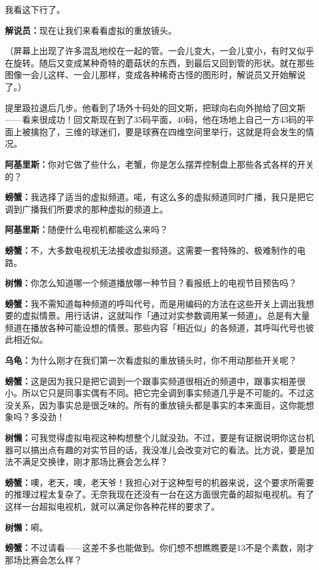 \documentclass[
  12pt,
  twoside,
  openright,
  oldfontcommands,
]{memoir}
\newcommand{\dialogname}[1]{{\heifamily\bfseries #1}}
\begin{document}
我看这下行了。

\dialogname{解说员：}现在让我们来看看虚拟的重放镜头。

（屏幕上出现了许多混乱地绞在一起的管。一会儿变大，一会儿变小，有时又似乎在旋转。随后又变成某种奇特的蘑菇状的东西，到最后又回到管的形状。就在那些图像一会儿这样、一会儿那样，变成各种稀奇古怪的图形时，解说员又开始解说了。）

提里趿拉退后几步。他看到了场外十码处的回文斯，把球向右向外抛给了回文斯------看来很成功！回文斯现在到了35码平面，40码，他在场地上自己一方43码的平面上被擒抱了，三维的球迷们，要是球赛在四维空间里举行，这就是将会发生的情况。

\dialogname{阿基里斯：}你对它做了些什么，老蟹，你是怎么摆弄控制盘上那些各式各样的开关的？

\dialogname{螃蟹：}我选择了适当的虚拟频道。喏，有这么多的虚拟频道同时广播，我只是把它调到广播我们所要求的那种虚拟的频道上。

\dialogname{阿基里斯：}随便什么电视机都能这么来吗？

\dialogname{螃蟹：}不，大多数电视机无法接收虚拟频道。这需要一套特殊的、极难制作的电路。

\dialogname{树懒：}你怎么知道哪一个频道播放哪一种节目？看报纸上的电视节目预告吗？

\dialogname{螃蟹：}我不需知道每种频道的呼叫代号，而是用编码的方法在这些开关上调出我想要的虚拟情景。用行话讲，这就叫作「通过对实参数调用某一频道」。总是有大量频道在播放各种可能设想的情景。那些内容「相近似」的各频道，其呼叫代号也彼此相近似。

\dialogname{乌龟：}为什么刚才在我们第一次看虚拟的重放镜头时，你不用动那些开关呢？

\dialogname{螃蟹：}这是因为我只是把它调到一个跟事实频道很相近的频道中，跟事实相差很小。所以它只是同事实偶有不同。把它完全调到事实频道几乎是不可能的。不过这没关系，因为事实总是很乏味的。所有的重放镜头都是事实的本来面目，这你能想象吗？多没劲！

\dialogname{树懒：}可我觉得虚拟电视这种构想整个儿就没劲。不过，要是有证据说明你这台机器可以搞出点有趣的对实节目的话，我没准儿会改变对它的看法。比方说，要是加法不满足交换律，刚才那场比赛会怎么样？

\dialogname{螃蟹：}噢，老天，噢，老天爷！我担心对于这种型号的机器来说，这个要求所需要的推理过程太复杂了。无奈我现在还没有一台在这方面很完备的超拟电视机。有了这样一台超拟电视机，就可以满足你各种花样的要求了。

\dialogname{树懒：}嗬。

\dialogname{螃蟹：}不过请看------这差不多也能做到。你们想不想瞧瞧要是13不是个素数，刚才那场比赛会怎么样？
\end{document}
